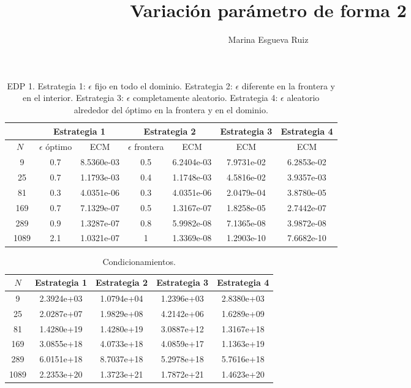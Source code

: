 \documentclass[11pt,a4paper]{article}
\author{Marina Esgueva Ruiz}
\title{Variación parámetro de forma 2}
\begin{document}
\begin{table}
\begin{center}
\caption{EDP 1. Estrategia 1: $\epsilon$ fijo en todo el dominio. Estrategia 2: $\epsilon$ diferente en la frontera y en el interior. Estrategia 3: $\epsilon$ completamente aleatorio. Estrategia 4: $\epsilon$ aleatorio alrededor del óptimo en la frontera y en el dominio. }
\begin{tabular}{|c|cc|cc|c|c|}
\hline
 & \multicolumn{2}{c|}{Estrategia 1} & \multicolumn{2}{c|}{Estrategia 2} & Estrategia 3 & Estrategia 4\\
\hline
$N$ & $\epsilon$ óptimo & ECM & $\epsilon$ frontera & ECM &  ECM & ECM  \\
\hline
\ 9 & 0.7 & 8.5360e-03 & 0.5 & 6.2404e-03 & 7.9731e-02  & 6.2853e-02 \\
\ 25 & 0.7 & 1.1793e-03  & 0.4 & 1.1748e-03  & 4.5816e-02  &3.9357e-03 \\
\ 81 &  0.3 & 4.0351e-06  & 0.3 & 4.0351e-06  & 2.0479e-04  & 3.8780e-05 \\
\ 169 & 0.7 & 7.1329e-07 & 0.5 & 1.3167e-07 & 1.8258e-05 & 2.7442e-07 \\ 
\ 289 & 0.9 & 1.3287e-07 & 0.8 & 5.9982e-08 & 7.1365e-08 & 3.9872e-08 \\
\ 1089 & 2.1 & 1.0321e-07 & 1 & 1.3369e-08 & 1.2903e-10 & 7.6682e-10 \\
\hline 
\end{tabular}


\end{center}
\end{table}


\begin{table}
\begin{center}
\caption{Condicionamientos. }
\begin{tabular}{|c|c|c|c|c|}
\hline
 $N$& Estrategia 1 & Estrategia 2 & Estrategia 3 & Estrategia 4 \\
\hline
9 & 2.3924e+03  & 1.0794e+04 &  1.2396e+03  & 2.8380e+03\\
25  & 2.0287e+07  & 1.9829e+08  & 4.2142e+06 & 1.6289e+09 \\
81 & 1.4280e+19 & 1.4280e+19 & 3.0887e+12  & 1.3167e+18 \\
169 & 3.0855e+18 & 4.0733e+18 & 4.0859e+17  & 1.1363e+19 \\
289 & 6.0151e+18 & 8.7037e+18 & 5.2978e+18 &  5.7616e+18 \\
1089 & 2.2353e+20 & 1.3723e+21 & 1.7872e+21 & 1.4623e+20 \\ 
\hline

\end{tabular}


\end{center}
\end{table}
\end{document}
